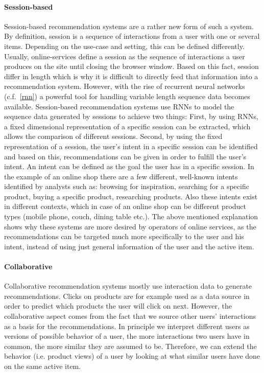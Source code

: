 \paragraph{Session-based}
Session-based recommendation systems are a rather new form of such a system.
By definition, session is a sequence of interactions from a user with one or several items.
Depending on the use-case and setting, this can be defined differently.
Usually, online-services define a session as the sequence of interactions a user produces on the site until closing the browser window.
Based on this fact, session differ in length which is why it is difficult to directly feed that information into a recommendation system.
However, with the rise of recurrent neural networks (c.f.~\ref{rnn}) a powerful tool for handling variable length sequence data becomes available.
Session-based recommendation systems use RNNs to model the sequence data generated by sessions to achieve two things:
First, by using RNNs, a fixed dimensional representation of a specific session can be extracted, which allows the comparison of different sessions.
Second, by using the fixed representation of a session, the user's intent in a specific session can be identified and based on this, recommendations can be given in order to fulfill the user's intent.
An intent can be defined as the goal the user has in a specific session.
In the example of an online shop there are a few different, well-known intents identified by analysts such as: browsing for inspiration, searching for a specific product, buying a specific product, researching products.
Also these intents exist in different contexts, which in case of an online shop can be different product types (mobile phone, couch, dining table etc.).
The above mentioned explanation shows why these systems are more desired by operators of online services, as the recommendations can be targeted much more specifically to the user and his intent, instead of using just general information of the user and the active item. 
\paragraph{Collaborative}
Collaborative recommendation systems mostly use interaction data to generate recommendations.
Clicks on products are for example used as a data source in order to predict which products the user will click on next.
However, the collaborative aspect comes from the fact that we source other users' interactions as a basis for the recommendations.
In principle we interpret different users as versions of possible behavior of a user, the more interactions two users have in common, the more similar they are assumed to be.
Therefore, we can extend the behavior (i.e. product views) of a user by looking at what similar users have done on the same active item.
